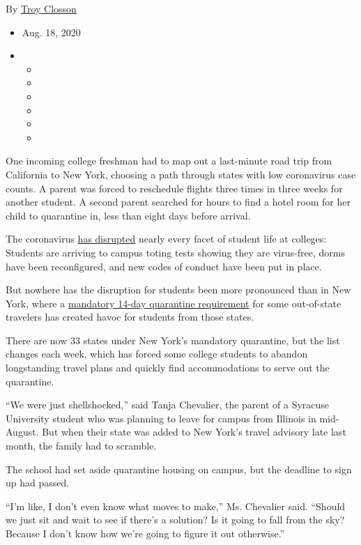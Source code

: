 By \href{https://www.nytimes3xbfgragh.onion/by/troy-closson}{Troy
Closson}

\begin{itemize}
\item
  Aug. 18, 2020
\item
  \begin{itemize}
  \item
  \item
  \item
  \item
  \item
  \item
  \end{itemize}
\end{itemize}

One incoming college freshman had to map out a last-minute road trip
from California to New York, choosing a path through states with low
coronavirus case counts. A parent was forced to reschedule flights three
times in three weeks for another student. A second parent searched for
hours to find a hotel room for her child to quarantine in, less than
eight days before arrival.

The coronavirus
\href{https://www.nytimes3xbfgragh.onion/2020/08/02/us/covid-college-reopening.html}{has
disrupted} nearly every facet of student life at colleges: Students are
arriving to campus toting tests showing they are virus-free, dorms have
been reconfigured, and new codes of conduct have been put in place.

But nowhere has the disruption for students been more pronounced than in
New York, where a
\href{https://coronavirus.health.ny.gov/covid-19-travel-advisory}{mandatory
14-day quarantine requirement} for some out-of-state travelers has
created havoc for students from those states.

There are now 33 states under New York's mandatory quarantine, but the
list changes each week, which has forced some college students to
abandon longstanding travel plans and quickly find accommodations to
serve out the quarantine.

``We were just shellshocked,'' said Tanja Chevalier, the parent of a
Syracuse University student who was planning to leave for campus from
Illinois in mid-August. But when their state was added to New York's
travel advisory late last month, the family had to scramble.

The school had set aside quarantine housing on campus, but the deadline
to sign up had passed.

``I'm like, I don't even know what moves to make,'' Ms. Chevalier said.
``Should we just sit and wait to see if there's a solution? Is it going
to fall from the sky? Because I don't know how we're going to figure it
out otherwise.''

